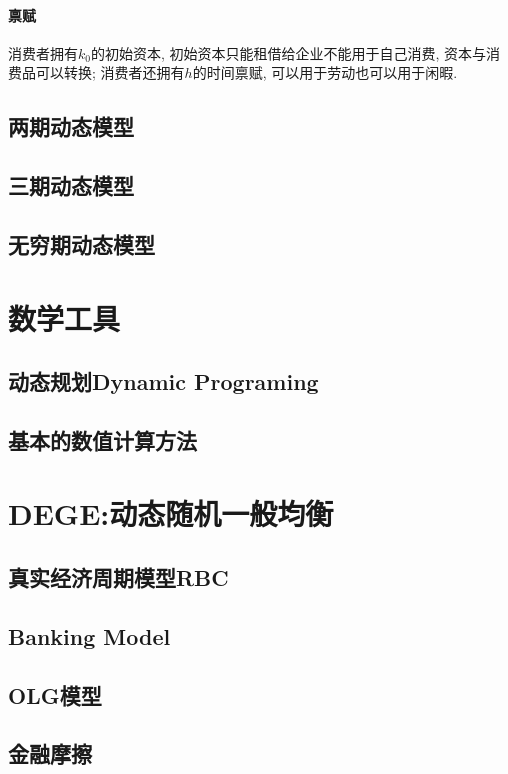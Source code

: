 \documentclass[lang=cn,10pt]{elegantbook}
\begin{document}
\subsection{禀赋}
消费者拥有$k_0$的初始资本, 初始资本只能租借给企业不能用于自己消费, 资本与消费品可以转换; 消费者还拥有$h$的时间禀赋, 可以用于劳动也可以用于闲暇.
\newpage

\chapter{两期动态模型}
\newpage

\chapter{三期动态模型}
\newpage

\chapter{无穷期动态模型}
\newpage

\part{数学工具}
\chapter{动态规划Dynamic Programing}

\chapter{基本的数值计算方法}

\part{DEGE:动态随机一般均衡}
\chapter{真实经济周期模型RBC}

\chapter{Banking Model}

\chapter{OLG模型}

\chapter{金融摩擦}
\end{document}
